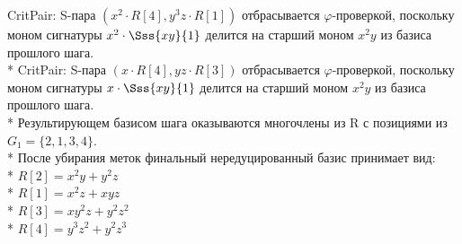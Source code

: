CritPair: S-пара $(x^{2}\cdot R[4],y^{3}z\cdot R[1])$  отбрасывается $\varphi$-проверкой, поскольку моном сигнатуры $x^{2}\cdot\Sss{xy}{1}$ делится на старший моном $x^{2}y$ из базиса прошлого шага.\\*
CritPair: S-пара $(x\cdot R[4],yz\cdot R[3])$  отбрасывается $\varphi$-проверкой, поскольку моном сигнатуры $x\cdot\Sss{xy}{1}$ делится на старший моном $x^{2}y$ из базиса прошлого шага.\\*
Результирующем базисом шага оказываются многочлены из R с позициями из $G_1=\{2, 1, 3, 4\}$.\\*
После убирания меток финальный нередуцированный базис принимает вид:\\*
$R[2]=x^{2}y+y^{2}z$\\*
$R[1]=x^{2}z+xyz$\\*
$R[3]=xy^{2}z+y^{2}z^{2}$\\*
$R[4]=y^{3}z^{2}+y^{2}z^{3}$